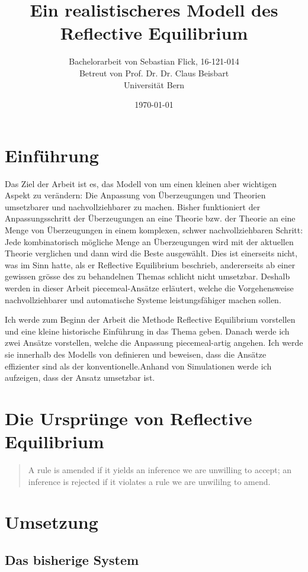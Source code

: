 \documentclass{article}
\title{Ein realistischeres Modell des Reflective Equilibrium}
\author{Bachelorarbeit von Sebastian Flick, 16-121-014\\Betreut von Prof. Dr. Dr. Claus Beisbart\\Universität Bern}
\date{\today}
\begin{document}
\maketitle
\section{Einführung}
Das Ziel der Arbeit ist es, das Modell von \autocite{beisbart_making_2015} um einen kleinen aber wichtigen Aspekt zu verändern: Die Anpassung von Überzeugungen und Theorien umsetzbarer und nachvollziehbarer zu machen. Bisher funktioniert der Anpassungsschritt der Überzeugungen an eine Theorie bzw. der Theorie an eine Menge von Überzeugungen in einem komplexen, schwer nachvollziehbaren Schritt: Jede kombinatorisch mögliche Menge an Überzeugungen wird mit der aktuellen Theorie verglichen und dann wird die Beste ausgewählt. Dies ist einerseits nicht, was \citeauthor{goodman_fact_1983} im Sinn hatte, als er Reflective Equilibrium beschrieb, andererseits ab einer gewissen grösse des zu behandelnen Themas schlicht nicht umsetzbar. Deshalb werden in dieser Arbeit piecemeal-Ansätze erläutert, welche die Vorgehensweise nachvollziehbarer und automatische Systeme leistungsfähiger machen sollen.

Ich werde zum Beginn der Arbeit die Methode Reflective Equilibrium vorstellen und eine kleine historische Einführung in das Thema geben. Danach werde ich zwei Ansätze vorstellen, welche die Anpassung piecemeal-artig angehen. Ich werde sie innerhalb des Modells von \citeauthor{beisbart_making_2015} definieren und beweisen, dass die Ansätze effizienter sind als der konventionelle.Anhand von Simulationen werde ich aufzeigen, dass der Ansatz umsetzbar ist.

\section{Die Ursprünge von Reflective Equilibrium}

\begin{quote}
    A rule is amended if it yields an inference we are unwilling to accept; an inference is rejected if it violates a rule we are unwililng to amend. \autocite[S.~64]{goodman_fact_1983}
\end{quote}

\section{Umsetzung}
\subsection{Das bisherige System}
\end{document}
